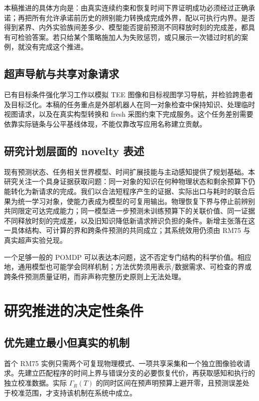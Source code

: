 \documentclass[11pt,a4paper,fontset=fandol]{ctexart}
\theoremstyle{definition}
\theoremstyle{remark}
\numberwithin{equation}{section}
\begin{document}
本稿推进的具体方向是：由真实连续约束和恢复时间下界证明成功必须经过正确承诺；再把所有允许承诺前历史的辨别能力转换成完成外界，配以可执行内界。是否得到紧界、内外实验族间差多少、模型能否提前预测不同释放时刻的完成差，都具有可检验答案。若只给某个策略施加人为失败惩罚，或只展示一次错过时机的案例，就没有完成这个推进。

\subsection{超声导航与共享对象请求}
已有目标条件强化学习工作以模拟 TEE 图像和目标视图学习导航，并检验跨患者及目标泛化\cite{usrl}。本稿的任务重点是外部机器人在同一对象检查中保持知识、处理临时视图请求，以及在真实构型转换和 fresh 采图约束下完成服务。这个任务差别需要依靠实际链条与公平基线体现，不能仅靠改写应用名称建立贡献。

\subsection{研究计划层面的 novelty 表述}
\begin{corebox}
现有预测状态、任务相关世界模型、时间扩展技能与主动感知提供了规划基础。本研究关注一个具身证据获取问题：同一对象的知识在何种物理状态和剩余预算下仍能转化为新请求的完成。我们以合法短程序产生的证据、实际出口与耗时的联合后果为统一学习对象，使能力表成为模型的可复用输出。物理恢复下界与停止前辨别共同限定可达完成能力；同一模型进一步预测未训练预算下的关联价值、同一证据不同释放时刻的完成差，以及旧知识降低新请求辨识负担的条件。新增主张落在这一具体结构、可计算的界和跨条件预测的共同成立；其系统效用仍须由 RM75 与真实超声实验兑现。
\end{corebox}

一个足够一般的 POMDP 可以表达本问题，这不否定专门结构的科学价值。相应地，通用模型也可能学会同样机制；方法优势须用表示/数据需求、可检查的界或跨条件预测质量证明，而非声称完整历史原则上无法处理。

\section{研究推进的决定性条件}
\label{sec:discussion}
\subsection{优先建立最小但真实的机制}
首个 RM75 实例只需两个可复现物理模式、一项共享采集和一个独立图像验收请求。先建立匹配程序的时间上界与错误分支的必要恢复代价，再获取感知和执行的独立校准数据。实际 $\Gamma_R(T)$ 的同时区间在预声明预算上避开零，且预测误差处于校准范围，才支持该机制在系统中成立。
\end{document}

